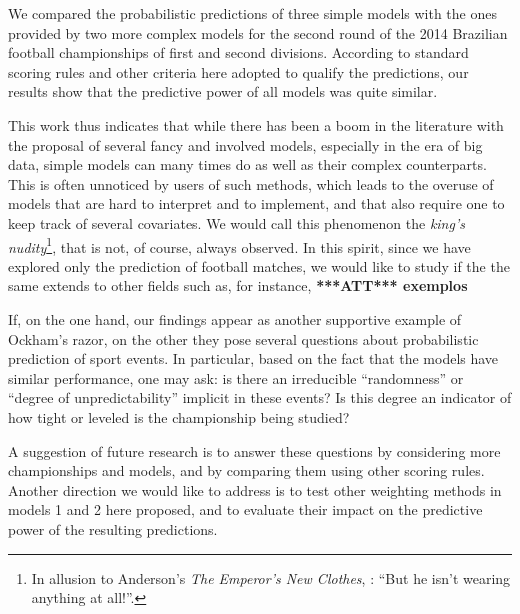 \documentclass[journal,article,accept,moreauthors,pdftex,12pt,a4paper]{mdpi}
\newcommand{\red}[1]{\textbf{\color{red} ***ATT*** #1}}
\begin{document}

We compared the probabilistic predictions of three simple models with the ones provided by two more complex models for the second round of the 2014 Brazilian football championships of first and second divisions.
According to standard scoring rules and other criteria here adopted to qualify the predictions, our results show that the predictive power of all models was quite similar.

This work thus indicates that while there has been a boom in the literature with the proposal of several fancy and involved models, especially in the era of big data, simple models can many times do as well as their complex counterparts. 
This is often unnoticed by users of such methods, which leads to the overuse of models that are hard to interpret and to implement, and that also require one to keep track of several covariates.
We would call this phenomenon the {\it king's nudity}\footnote{In allusion to Anderson's {\it The Emperor's New Clothes}, \cite{emperor}: ``But he isn't wearing anything at all!''.}, that is not, of course, always observed.
In this spirit, since we have explored only the prediction of football matches, we would like to study if the the same extends to other fields such as, for instance, \red{exemplos}  

If, on the one hand, our findings appear as another supportive example of Ockham's razor, on the other they pose several questions about probabilistic prediction of sport events.
In particular, based on the fact that the models have similar performance, one may ask: is there an irreducible ``randomness'' or ``degree of unpredictability'' implicit in these events?
Is this degree an indicator of how tight or leveled is the championship being studied?  

A suggestion of future research is to answer these questions by considering more championships and models, and  by comparing them using other scoring rules.
Another direction we would like to address is to test other weighting methods in models 1 and 2 here proposed, and to evaluate their impact on the predictive power of the resulting predictions.


\end{document}
